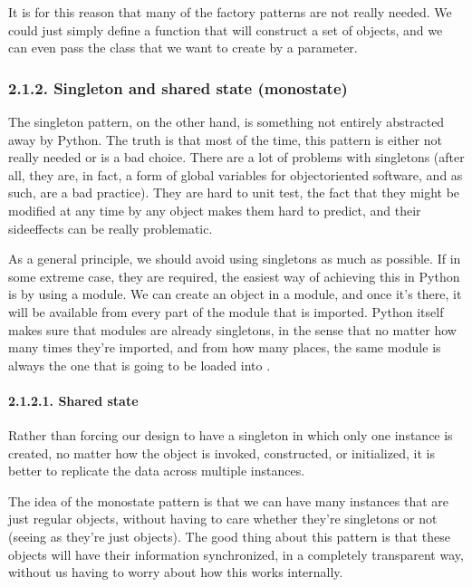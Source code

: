 \documentclass[a4paper,10pt,english]{sphinxmanual}
\begin{document}
It is for this reason that many of the factory patterns are not really needed. We could just
simply define a function that will construct a set of objects, and we can even pass the class
that we want to create by a parameter.


\subsubsection{2.1.2. Singleton and shared state (monostate)}
\label{\detokenize{chapters/9_design_patterns/index:singleton-and-shared-state-monostate}}
The singleton pattern, on the other hand, is something not entirely abstracted away by
Python. The truth is that most of the time, this pattern is either not really needed or is a bad
choice. There are a lot of problems with singletons (after all, they are, in fact, a form of
global variables for object\sphinxhyphen{}oriented software, and as such, are a bad practice). They are hard
to unit test, the fact that they might be modified at any time by any object makes them hard
to predict, and their side\sphinxhyphen{}effects can be really problematic.

As a general principle, we should avoid using singletons as much as possible. If in some
extreme case, they are required, the easiest way of achieving this in Python is by using a
module. We can create an object in a module, and once it’s there, it will be available from
every part of the module that is imported. Python itself makes sure that modules are
already singletons, in the sense that no matter how many times they’re imported, and from
how many places, the same module is always the one that is going to be loaded
into .


\paragraph{2.1.2.1. Shared state}
\label{\detokenize{chapters/9_design_patterns/index:shared-state}}
Rather than forcing our design to have a singleton in which only one instance is created, no
matter how the object is invoked, constructed, or initialized, it is better to replicate the data
across multiple instances.

The idea of the monostate pattern is that we can have many instances that are
just regular objects, without having to care whether they’re singletons or not (seeing as
they’re just objects). The good thing about this pattern is that these objects will have their
information synchronized, in a completely transparent way, without us having to worry
about how this works internally.
\end{document}

